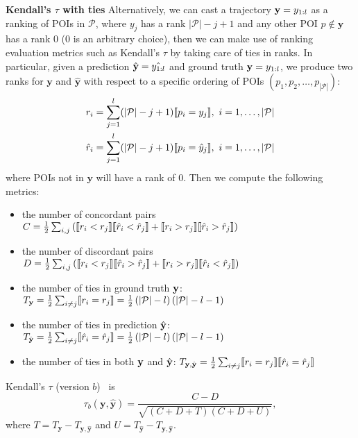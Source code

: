 \textbf{Kendall's $\tau$ with ties}
Alternatively, we can cast a trajectory $\mathbf{y} = y_{1:l}$ as a ranking of POIs in $\mathcal{P}$,
where $y_j$ has a rank $| \mathcal{P} | - j + 1$ and any other POI $p \notin \mathbf{y}$ has a rank $0$ ($0$ is an arbitrary choice),
then we can make use of ranking evaluation metrics such as Kendall's $\tau$ by taking care of ties in ranks.
In particular, given a prediction $\hat{\mathbf{y}} = \hat{y_{1:l}}$ and ground truth $\mathbf{y} = y_{1:l}$,
we produce two ranks for $\mathbf{y}$ and $\hat{\mathbf{y}}$ with respect to 
a specific ordering of POIs $(p_1, p_2, \dots, p_{|\mathcal{P}|})$:
\begin{align*}
r_i       &= \sum_{j=1}^l (| \mathcal{P} | - j + 1)  \llbracket p_i = y_j \rrbracket,~
i = 1, \dots, | \mathcal{P} | \\
\hat{r}_i &= \sum_{j=1}^l (| \mathcal{P} | - j + 1)  \llbracket p_i = \hat{y}_j \rrbracket,~
i = 1, \dots, | \mathcal{P} |
\end{align*}
where POIs not in $\mathbf{y}$ will have a rank of $0$.
Then we compute the following metrics:
\begin{itemize}
\item the number of concordant pairs \(
      C = \frac{1}{2} \sum_{i,j} \left(\llbracket r_i < r_j \rrbracket  \llbracket \hat{r}_i < \hat{r}_j \rrbracket +
                      \llbracket r_i > r_j \rrbracket  \llbracket \hat{r}_i > \hat{r}_j \rrbracket \right) \)
\item the number of discordant pairs \(
      D = \frac{1}{2} \sum_{i,j} \left(\llbracket r_i < r_j \rrbracket  \llbracket \hat{r}_i > \hat{r}_j \rrbracket +
                      \llbracket r_i > r_j \rrbracket  \llbracket \hat{r}_i < \hat{r}_j \rrbracket \right) \)
\item the number of ties in ground truth $\mathbf{y}$: \(
      T_{\mathbf{y}} = \frac{1}{2} \sum_{i \ne j} \llbracket r_i = r_j \rrbracket 
                     = \frac{1}{2} \left( |\mathcal{P}| - l \right) \left( |\mathcal{P}| - l - 1 \right) \)
\item the number of ties in prediction $\hat{\mathbf{y}}$: \(
      T_{\hat{\mathbf{y}}} = \frac{1}{2} \sum_{i \ne j} \llbracket \hat{r}_i = \hat{r}_j \rrbracket 
                           = \frac{1}{2} \left( |\mathcal{P}| - l \right) \left( |\mathcal{P}| - l - 1 \right) \)
\item the number of ties in both $\mathbf{y}$ and $\hat{\mathbf{y}}$: \(
      T_{\mathbf{y},\hat{\mathbf{y}}} = \frac{1}{2} \sum_{i \ne j} \llbracket r_i = r_j \rrbracket  \llbracket \hat{r}_i = \hat{r}_j \rrbracket \)
\end{itemize}
Kendall's $\tau$ (version $b$)~\cite{kendall1945,agresti2010analysis} is
\begin{equation*}
\tau_b(\mathbf{y}, \hat{\mathbf{y}}) = \frac{C - D}{\sqrt{(C + D + T) (C + D + U)}},
\end{equation*}
where $T = T_{\mathbf{y}} - T_{\mathbf{y},\hat{\mathbf{y}}}$ and $U = T_{\hat{\mathbf{y}}} - T_{\mathbf{y},\hat{\mathbf{y}}}$.

